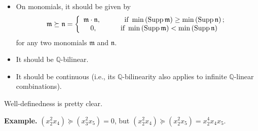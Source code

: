 \documentclass{beamer}
\newcommand{\QQ}{{\mathbb Q}}
\theoremstyle{plain}
\begin{document}
\begin{frame}
\begin{itemize}
{\begin{itemize}
\item On monomials, it should be given by
\[
\mathfrak{m}\left.  \succeq\right.  \mathfrak{n}=\left\{
\begin{array}
[c]{c}%
\mathfrak{m}\cdot\mathfrak{n},\ \ \ \ \ \ \ \ \ \ \text{if }\min\left(
\operatorname*{Supp}\mathfrak{m}\right) \geq \min\left(  \operatorname*{Supp}%
\mathfrak{n}\right)  ;\\
0,\ \ \ \ \ \ \ \ \ \ \text{if }\min\left(  \operatorname*{Supp}%
\mathfrak{m}\right) < \min\left(  \operatorname*{Supp}\mathfrak{n}\right)
\end{array}
\right.
\]
for any two monomials $\mathfrak{m}$ and $\mathfrak{n}$.
\item It should be $\QQ$-bilinear.
\item It should be continuous (i.e., its $\QQ$-bilinearity also
applies to infinite $\QQ$-linear combinations).
\end{itemize}

\item Well-definedness is pretty clear.

\item \textbf{Example.} $\left(x_2^2 x_4\right) \left.\succeq\right. \left(x_3^2 x_5\right) = 0$, but
$\left(x_2^2 x_4\right) \left.\succeq\right. \left(x_2^2 x_5\right) = x_2^4 x_4 x_5$.
}


\end{itemize}

\vspace{9cm}

\end{frame}
\end{document}
